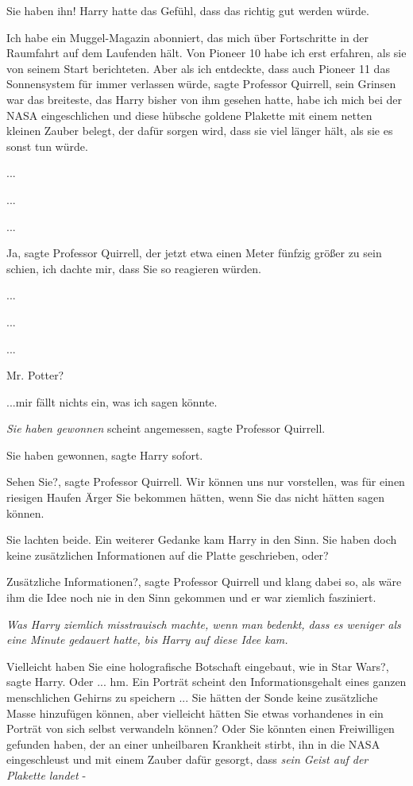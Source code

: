 \glqq{}Sie haben ihn!\grqq{} Harry hatte das Gefühl, dass das richtig gut werden
würde.

\glqq{}Ich habe ein Muggel-Magazin abonniert, das mich über Fortschritte in der
Raumfahrt auf dem Laufenden hält. Von Pioneer 10 habe ich erst erfahren, als sie
von seinem Start berichteten. Aber als ich entdeckte, dass auch Pioneer 11 das
Sonnensystem für immer verlassen würde\grqq{}, sagte Professor Quirrell, sein
Grinsen war das breiteste, das Harry bisher von ihm gesehen hatte, \glqq{}habe
ich mich bei der NASA eingeschlichen und diese hübsche goldene Plakette mit
einem netten kleinen Zauber belegt, der dafür sorgen wird, dass sie viel länger
hält, als sie es sonst tun würde.\grqq

...

...

...

\glqq{}Ja\grqq{}, sagte Professor Quirrell, der jetzt etwa einen Meter fünfzig
größer zu sein schien, \glqq{}ich dachte mir, dass Sie so reagieren
würden.\grqq{}

...

...

...

\glqq{}Mr. Potter?\grqq{}

\glqq{}...mir fällt nichts ein, was ich sagen könnte.\grqq{}

\glqq{}\emph{Sie haben gewonnen} scheint angemessen\grqq{}, sagte Professor
Quirrell.

\glqq{}Sie haben gewonnen\grqq{}, sagte Harry sofort.

\glqq{}Sehen Sie?\grqq{}, sagte Professor Quirrell. \glqq{}Wir können uns nur
vorstellen, was für einen riesigen Haufen Ärger Sie bekommen hätten, wenn Sie
das nicht hätten sagen können.\grqq{}

Sie lachten beide. Ein weiterer Gedanke kam Harry in den Sinn. \glqq{}Sie haben
doch keine zusätzlichen Informationen auf die Platte geschrieben, oder?\grqq{}

\glqq{}Zusätzliche Informationen?\grqq{}, sagte Professor Quirrell und klang
dabei so, als wäre ihm die Idee noch nie in den Sinn gekommen und er war
ziemlich fasziniert.

\emph{Was Harry ziemlich misstrauisch machte, wenn man bedenkt, dass es weniger
als eine Minute gedauert hatte, bis Harry auf diese Idee kam.}

\glqq{}Vielleicht haben Sie eine holografische Botschaft eingebaut, wie in Star
Wars?\grqq{}, sagte Harry. \glqq{}Oder ... hm. Ein Porträt scheint den
Informationsgehalt eines ganzen menschlichen Gehirns zu speichern ... Sie hätten
der Sonde keine zusätzliche Masse hinzufügen können, aber vielleicht hätten Sie
etwas vorhandenes in ein Porträt von sich selbst verwandeln können? Oder Sie
könnten einen Freiwilligen gefunden haben, der an einer unheilbaren Krankheit
stirbt, ihn in die NASA eingeschleust und mit einem Zauber dafür gesorgt, dass
\emph{sein Geist auf der Plakette landet} -\grqq{}

